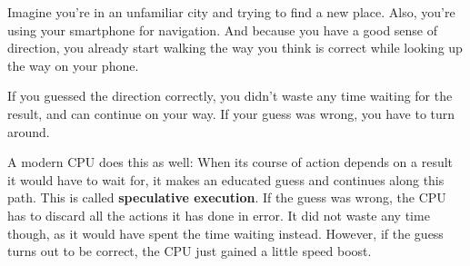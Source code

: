 
Imagine you're in an unfamiliar city and trying to find a new place.
Also, you're using your smartphone for navigation. And because you
have a good sense of direction, you already start walking the way you
think is correct while looking up the way on your phone.

If you guessed the direction correctly, you didn't waste any time
waiting for the result, and can continue on your way. If your guess
was wrong, you have to turn around.

A modern CPU does this as well: When its course of action depends on a
result it would have to wait for, it makes an educated guess and
continues along this path. This is called \textbf{speculative execution}.
If the guess was wrong, the CPU has to discard all the actions it has
done in error. It did not waste any time though, as it would have
spent the time waiting instead. However, if the guess turns out to be
correct, the CPU just gained a little speed boost.

